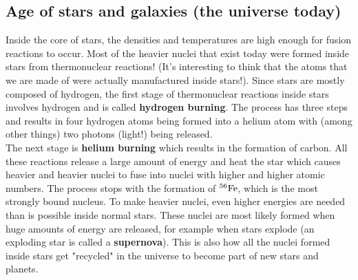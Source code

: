 \subsection{Age of stars and galaxies (the universe today)}
Inside the core of stars, the densities and temperatures are high enough for fusion reactions to occur. Most of the heavier nuclei that exist today were formed inside stars from thermonuclear reactions! (It's interesting to think that the atoms that we are made of were actually manufactured inside stars!). Since stars are mostly composed of hydrogen, the first stage of thermonuclear reactions inside stars involves hydrogen and is called \textbf{hydrogen burning}. The process has three steps and results in four hydrogen atoms being formed into a helium atom with (among other things) two photons (light!) being released. \\

The next stage is \textbf{helium burning} which results in the formation of carbon. All these reactions release a large amount of energy and heat the star which causes heavier and heavier nuclei to fuse into nuclei with higher and higher atomic numbers. The process stops with the formation of $^{56}\rm{Fe}$, which is the most strongly bound nucleus. To make heavier nuclei, even higher energies are needed than is possible inside normal stars. These nuclei are most likely formed when huge amounts of energy are released, for example when stars explode (an exploding star is called a \textbf{supernova}). This is also how all the nuclei formed inside stars get "recycled" in the universe to become part of new stars and planets.


